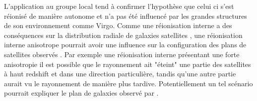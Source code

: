 L'application au groupe local tend à confirmer l'hypothèse que celui ci s'est réionisé de manière autonome et n'a pas été influencé par les grandes structures de son environnement comme Virgo.
Comme une réionisation interne a des conséquences sur la distribution radiale de galaxies satellites \citep{2011MNRAS.417L..93O}, une réionisation interne anisotrope pourrait avoir une influence sur la configuration des plans de satellites observés \citep{2015ApJ...800...34G}.
Par exemple une réionisation interne présentant une forte anisotropie il est possible que le rayonnement ait "éteint" une partie des satellites à haut redshift et dans une direction particulière, tandis qu'une autre partie aurait vu le rayonnement de manière plus tardive.
Potentiellement un tel scénario pourrait expliquer le plan de galaxies observé par \cite{2014Natur.511..563I}.